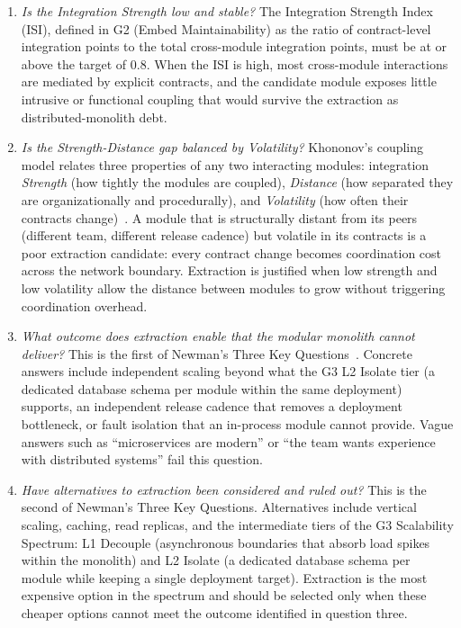 \begin{enumerate}[itemsep=8pt,topsep=2pt]
  \item \emph{Is the Integration Strength low and stable?} The Integration Strength Index (ISI), defined in G2 (Embed Maintainability) as the ratio of contract-level integration points to the total cross-module integration points, must be at or above the target of $0.8$. When the ISI is high, most cross-module interactions are mediated by explicit contracts, and the candidate module exposes little intrusive or functional coupling that would survive the extraction as distributed-monolith debt.

  \item \emph{Is the Strength-Distance gap balanced by Volatility?} Khononov's coupling model relates three properties of any two interacting modules: integration \emph{Strength} (how tightly the modules are coupled), \emph{Distance} (how separated they are organizationally and procedurally), and \emph{Volatility} (how often their contracts change)~\cite{khononov2024balancing}. A module that is structurally distant from its peers (different team, different release cadence) but volatile in its contracts is a poor extraction candidate: every contract change becomes coordination cost across the network boundary. Extraction is justified when low strength and low volatility allow the distance between modules to grow without triggering coordination overhead.

  \item \emph{What outcome does extraction enable that the modular monolith cannot deliver?} This is the first of Newman's Three Key Questions~\cite{newman2019monolith}. Concrete answers include independent scaling beyond what the G3 L2 Isolate tier (a dedicated database schema per module within the same deployment) supports, an independent release cadence that removes a deployment bottleneck, or fault isolation that an in-process module cannot provide. Vague answers such as ``microservices are modern'' or ``the team wants experience with distributed systems'' fail this question.

  \item \emph{Have alternatives to extraction been considered and ruled out?} This is the second of Newman's Three Key Questions. Alternatives include vertical scaling, caching, read replicas, and the intermediate tiers of the G3 Scalability Spectrum: L1 Decouple (asynchronous boundaries that absorb load spikes within the monolith) and L2 Isolate (a dedicated database schema per module while keeping a single deployment target). Extraction is the most expensive option in the spectrum and should be selected only when these cheaper options cannot meet the outcome identified in question three.


\end{enumerate}
